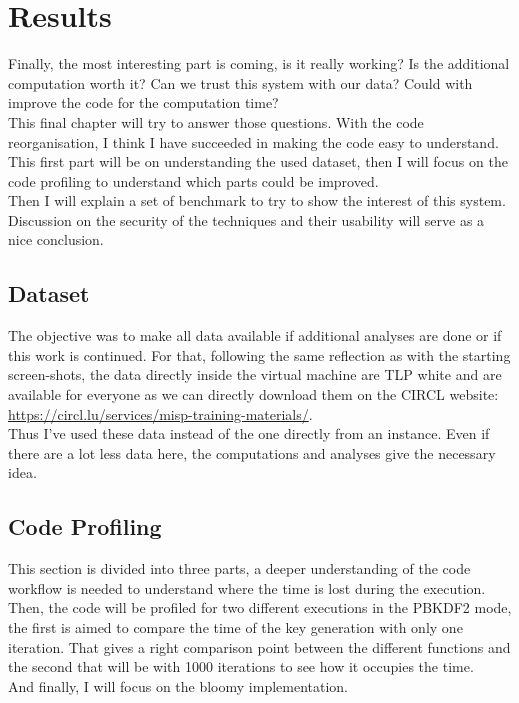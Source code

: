 \documentclass{eplmastersthesis}
\begin{document}
\chapter{Results}
Finally, the most interesting part is coming, is it really working? Is the additional computation worth it? Can we trust this system with our data? Could with improve the code for the computation time?\\
This final chapter will try to answer those questions. With the code reorganisation, I think I have succeeded in making the code easy to understand.\\
This first part will be on understanding the used dataset, then I will focus on the code profiling to understand which parts could be improved.\\
Then I will explain a set of benchmark to try to show the interest of this system.\\
Discussion on the security of the techniques and their usability will serve as a nice conclusion.\\

\section{Dataset}
The objective was to make all data available if additional analyses are done or if this work is continued. For that, following the same reflection as with the starting screen-shots, the data directly inside the virtual machine are TLP white and are available for everyone as we can directly download them on the CIRCL website: \url{https://circl.lu/services/misp-training-materials/}.\\
Thus I've used these data instead of the one directly from an instance. Even if there are a lot less data here, the computations and analyses give the necessary idea.

\section{Code Profiling}
This section is divided into three parts, a deeper understanding of the code workflow is needed to understand where the time is lost during the execution. Then, the code will be profiled for two different executions in the PBKDF2 mode, the first is aimed to compare the time of the key generation with only one iteration. That gives a right comparison point between the different functions and the second that will be with 1000 iterations to see how it occupies the time. \\
And finally, I will focus on the bloomy implementation.
\end{document}
